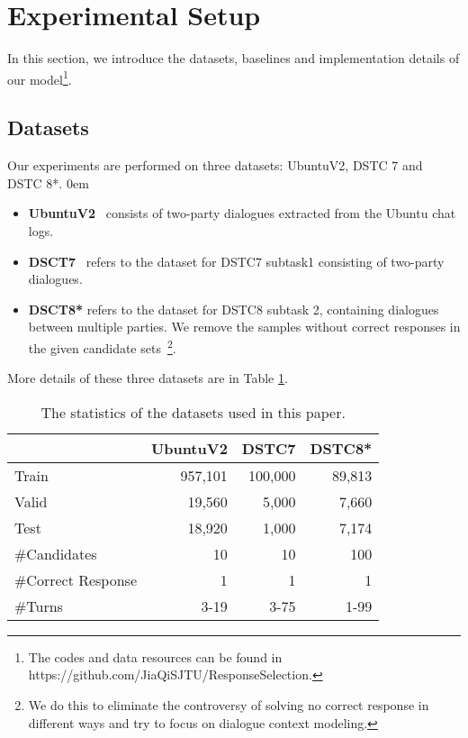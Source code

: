 \section{Experimental Setup}
\label{sec:eval}
In this section, we introduce the datasets, baselines and implementation details of our model\footnote{The codes and data resources
can be found in https://github.com/JiaQiSJTU/ResponseSelection.}.

\subsection{Datasets}
Our experiments are performed on three datasets:
UbuntuV2, DSTC 7 and DSTC 8*.
\itemsep0em
\begin{itemize}

\item \textbf{UbuntuV2}~\cite{LowePSCLP17} consists of two-party dialogues extracted from the Ubuntu chat logs.

\item \textbf{DSCT7}~\cite{gunasekara2019dstc7} refers to the dataset for DSTC7 subtask1 consisting of two-party dialogues.

\item \textbf{DSCT8*} refers to the dataset for DSTC8 subtask 2, containing dialogues between multiple parties. We remove the samples without correct responses in the given candidate sets~\footnote{We do this to eliminate the controversy of solving no correct response in different ways and try to focus on dialogue context modeling.}.
\end{itemize}
More details of these three datasets are in Table \ref{tab:dataset}.

\begin{table}[th]
	\centering
	\small
	\begin{tabular}{lrrr}
		\toprule[1pt]
		\textbf{} & {UbuntuV2}& {DSTC7}& {DSTC8*} \\ 
    	\midrule[1pt]
		{Train} & 957,101 &100,000&89,813\\
		{Valid} & 19,560 & 5,000&7,660\\
		{Test} &18,920 &1,000&7,174\\
		{\#Candidates} &10& 10&100\\
		{\#Correct Response}&1&1&1 \\
		{\#Turns } & 3-19&3-75& 1-99\\
		\bottomrule[1pt]
	\end{tabular}
	\caption{The statistics of the datasets used in this paper.}
	\label{tab:dataset}
\end{table}



